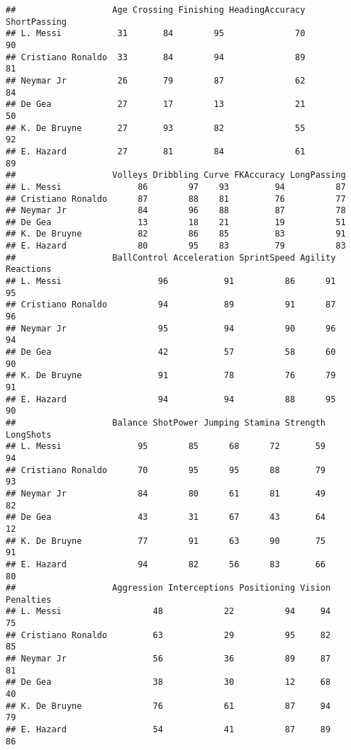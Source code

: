 \documentclass[]{article}
\begin{document}
\begin{verbatim}
##                   Age Crossing Finishing HeadingAccuracy ShortPassing
## L. Messi           31       84        95              70           90
## Cristiano Ronaldo  33       84        94              89           81
## Neymar Jr          26       79        87              62           84
## De Gea             27       17        13              21           50
## K. De Bruyne       27       93        82              55           92
## E. Hazard          27       81        84              61           89
##                   Volleys Dribbling Curve FKAccuracy LongPassing
## L. Messi               86        97    93         94          87
## Cristiano Ronaldo      87        88    81         76          77
## Neymar Jr              84        96    88         87          78
## De Gea                 13        18    21         19          51
## K. De Bruyne           82        86    85         83          91
## E. Hazard              80        95    83         79          83
##                   BallControl Acceleration SprintSpeed Agility Reactions
## L. Messi                   96           91          86      91        95
## Cristiano Ronaldo          94           89          91      87        96
## Neymar Jr                  95           94          90      96        94
## De Gea                     42           57          58      60        90
## K. De Bruyne               91           78          76      79        91
## E. Hazard                  94           94          88      95        90
##                   Balance ShotPower Jumping Stamina Strength LongShots
## L. Messi               95        85      68      72       59        94
## Cristiano Ronaldo      70        95      95      88       79        93
## Neymar Jr              84        80      61      81       49        82
## De Gea                 43        31      67      43       64        12
## K. De Bruyne           77        91      63      90       75        91
## E. Hazard              94        82      56      83       66        80
##                   Aggression Interceptions Positioning Vision Penalties
## L. Messi                  48            22          94     94        75
## Cristiano Ronaldo         63            29          95     82        85
## Neymar Jr                 56            36          89     87        81
## De Gea                    38            30          12     68        40
## K. De Bruyne              76            61          87     94        79
## E. Hazard                 54            41          87     89        86

\end{verbatim}
\end{document}
